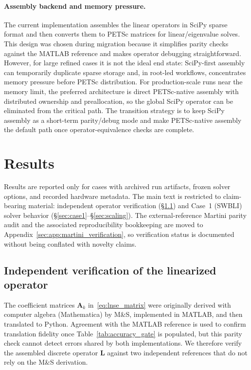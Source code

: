 \documentclass[11pt]{article}
\newcommand{\bA}{\mathbf{A}}
\newcommand{\bL}{\mathbf{L}}
\begin{document}
\paragraph{Assembly backend and memory pressure.}
The current implementation assembles the linear operators in SciPy sparse format and then converts them to PETSc matrices for linear/eigenvalue solves.
This design was chosen during migration because it simplifies parity checks against the MATLAB reference and makes operator debugging straightforward.
However, for large refined cases it is not the ideal end state: SciPy-first assembly can temporarily duplicate sparse storage and, in root-led workflows, concentrates memory pressure before PETSc distribution.
For production-scale runs near the memory limit, the preferred architecture is direct PETSc-native assembly with distributed ownership and preallocation, so the global SciPy operator can be eliminated from the critical path.
The transition strategy is to keep SciPy assembly as a short-term parity/debug mode and make PETSc-native assembly the default path once operator-equivalence checks are complete.

\section{Results}
\label{sec:results}

Results are reported only for cases with archived run artifacts, frozen solver options, and recorded hardware metadata.
The main text is restricted to claim-bearing material: independent operator verification (\S\ref{sec:linearization_verification}) and Case~1 (SWBLI) solver behavior (\S\ref{sec:case1}--\S\ref{sec:scaling}).
The external-reference Martini parity audit and the associated reproducibility bookkeeping are moved to Appendix~\ref{sec:app:martini_verification}, so verification status is documented without being conflated with novelty claims.

\subsection{Independent verification of the linearized operator}
\label{sec:linearization_verification}

The coefficient matrices $\bA_k$ in~\eqref{eq:lnse_matrix} were originally derived with computer algebra (Mathematica) by M\&S, implemented in MATLAB, and then translated to Python.
Agreement with the MATLAB reference is used to confirm translation fidelity once Table~\ref{tab:accuracy_gate} is populated, but this parity check cannot detect errors shared by both implementations.
We therefore verify the assembled discrete operator $\bL$ against two independent references that do not rely on the M\&S derivation.
\end{document}
